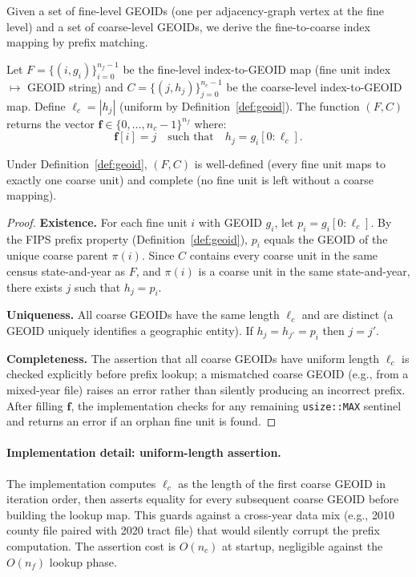 Given a set of fine-level GEOIDs (one per adjacency-graph vertex at the
fine level) and a set of coarse-level GEOIDs, we derive the fine-to-coarse
index mapping by prefix matching.

\begin{definition}[\derive{}]
\label{def:derive}
Let $F = \{(i, g_i)\}_{i=0}^{n_f - 1}$ be the fine-level index-to-GEOID
map (fine unit index $\mapsto$ GEOID string) and
$C = \{(j, h_j)\}_{j=0}^{n_c - 1}$ be the coarse-level index-to-GEOID map.
Define $\ell_c = |h_j|$ (uniform by Definition~\ref{def:geoid}).
The function \derive{}$(F, C)$ returns the vector
$\mathbf{f} \in \{0,\ldots,n_c-1\}^{n_f}$ where:
\[
  \mathbf{f}[i] = j
  \quad\text{such that}\quad
  h_j = g_i[0:\ell_c].
\]
\end{definition}

\begin{theorem}
\label{thm:derive}
Under Definition~\ref{def:geoid}, \derive{}$(F, C)$ is well-defined
(every fine unit maps to exactly one coarse unit) and complete
(no fine unit is left without a coarse mapping).
\end{theorem}

\begin{proof}
\textbf{Existence.}
For each fine unit $i$ with GEOID $g_i$, let $p_i = g_i[0:\ell_c]$.
By the FIPS prefix property (Definition~\ref{def:geoid}), $p_i$ equals
the GEOID of the unique coarse parent $\pi(i)$.
Since $C$ contains every coarse unit in the same census state-and-year
as $F$, and $\pi(i)$ is a coarse unit in the same state-and-year,
there exists $j$ such that $h_j = p_i$.

\textbf{Uniqueness.}
All coarse GEOIDs have the same length $\ell_c$ and are distinct (a GEOID
uniquely identifies a geographic entity).
If $h_j = h_{j'} = p_i$ then $j = j'$.

\textbf{Completeness.}
The assertion that all coarse GEOIDs have uniform length $\ell_c$ is
checked explicitly before prefix lookup; a mismatched coarse GEOID
(e.g., from a mixed-year file) raises an error rather than silently
producing an incorrect prefix.
After filling $\mathbf{f}$, the implementation checks for any remaining
\texttt{usize::MAX} sentinel and returns an error if an orphan fine unit
is found.
\end{proof}

\paragraph{Implementation detail: uniform-length assertion.}
The implementation computes $\ell_c$ as the length of the first coarse
GEOID in iteration order, then asserts equality for every subsequent
coarse GEOID before building the lookup map.
This guards against a cross-year data mix (e.g., 2010 county file paired
with 2020 tract file) that would silently corrupt the prefix computation.
The assertion cost is $O(n_c)$ at startup, negligible against the $O(n_f)$
lookup phase.

